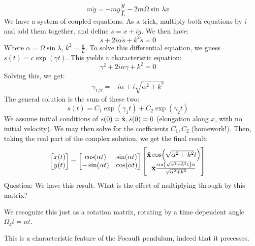 \documentclass[../PHYS306Notes.tex]{subfiles}
\begin{document}
\[m\ddot{y} = -mg\frac{y}{L} - 2m\Omega\sin\lambda\dot{x}\]
We have a system of coupled equations. As a trick, multiply both equations by $i$ and add them together, and define $s = x + iy$. We then have:
\[\ddot{s} + 2i\alpha \dot{s} + k^2\dot{s} = 0\]
Where $\alpha = \Omega\sin\lambda$, $k^2 = \frac{g}{L}$. To solve this differential equation, we guess $s(t) = c\exp(\gamma t)$. This yields a characteristic equation:
\[\gamma^2 + 2i\alpha\gamma + k^2 = 0\]
Solving this, we get:
\[\gamma_{1/2} = -i\alpha \pm i\sqrt{\alpha^2 + k^2}\]
The general solution is the sum of these two:
\[s(t) = C_1\exp(\gamma_1 t) + C_2\exp(\gamma_2 t)\]
We assume initial conditions of $s(0) = \hat{\mathbf{x}}, \dot{s}(0) = 0$ (elongation along $x$, with no initial velocity). We may then solve for the coefficients $C_1, C_2$ (homework!). Then, taking the real part of the complex solution, we get the final result:
\[\begin{bmatrix}x(t) \\ y(t)\end{bmatrix} = \begin{bmatrix}\cos(\alpha t) & \sin(\alpha t) \\ -\sin(\alpha t) & \cos(\alpha t)\end{bmatrix}\begin{bmatrix}\hat{\mathbf{x}} \cos(\sqrt{\alpha^2 + k^2} t) \\ \hat{\mathbf{x}}\frac{\sin(\sqrt{\alpha^2 + k^2}t)\alpha }{\sqrt{\alpha^2 + k^2}}\end{bmatrix}\]
Question: We have this result. What is the effect of multiplying through by this matrix? 
\begin{s}
We recognize this just as a rotation matrix, rotating by a time dependent angle $\Omega_zt = \alpha t$.
\end{s}
This is a characteristic feature of the Focault pendulum, indeed that it precesses. 
\end{document}
